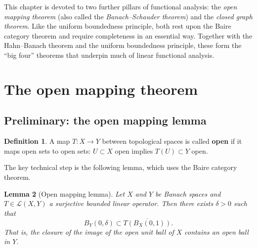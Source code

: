 \documentclass[a4paper,12pt]{book}
\theoremstyle{definition}
\newtheorem{definition}{Definition}[chapter]
\theoremstyle{plain}
\newtheorem{lemma}[definition]{Lemma}
\theoremstyle{remark}
\begin{document}
\vspace{1em}
\noindent
This chapter is devoted to two further pillars of functional analysis: the
\emph{open mapping theorem} (also called the
\emph{Banach--Schauder theorem}) and the
\emph{closed graph theorem}. Like the uniform boundedness
principle, both rest upon the Baire category theorem and require completeness in an
essential way. Together with the Hahn--Banach theorem and the uniform boundedness
principle, these form the ``big four'' theorems that
underpin much of linear functional analysis.

\section{The open mapping theorem}\label{sec:omt}

\subsection{Preliminary: the open mapping lemma}

\begin{definition}\label{def:open-map}
A map $T \colon X \to Y$ between topological spaces is called \textbf{open} if
it maps open sets to open sets: $U \subset X$ open implies $T(U) \subset Y$ open.
\end{definition}

The key technical step is the following lemma, which uses the Baire category theorem.

\begin{lemma}[Open mapping lemma]\label{lem:open-mapping-lemma}
Let $X$ and $Y$ be Banach spaces and $T \in \mathcal{L}(X,Y)$ a surjective
bounded linear operator. Then there exists $\delta > 0$ such that
\[
  B_Y(0, \delta) \subset \overline{T(B_X(0,1))}.
\]
That is, the closure of the image of the open unit ball of $X$ contains an open
ball in $Y$.
\end{lemma}
\end{document}
